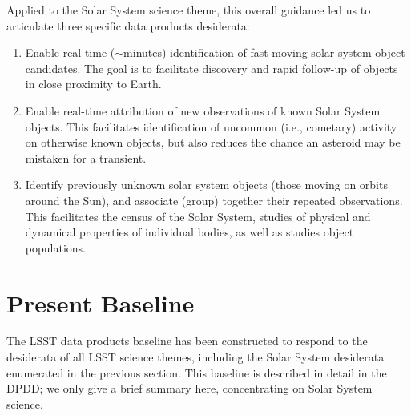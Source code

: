 \documentclass[DM,authoryear,toc,lsstdraft]{lsstdoc}
\begin{document}
Applied to the Solar System science theme, this overall guidance led us to 
articulate three specific data products desiderata:
%
\begin{enumerate}
	\item Enable real-time ($\sim$minutes) identification of fast-moving solar system object candidates. The goal is to facilitate discovery and rapid follow-up of objects in close proximity to Earth.
	\item Enable real-time attribution of new observations of known Solar System objects. This facilitates identification of uncommon (i.e., cometary) activity on otherwise known objects, but also reduces the chance an asteroid may be mistaken for a transient.
	\item Identify previously unknown solar system objects (those moving on orbits around the Sun), and associate (group) together their repeated observations. This facilitates the census of the Solar System, studies of physical and dynamical properties of individual bodies, as well as studies object populations.
\end{enumerate}


\section{Present Baseline}

The LSST data products baseline  has been constructed to respond to the desiderata of all LSST science themes, including the Solar System desiderata enumerated in the previous section. This baseline is described in detail in the DPDD; we only give a brief summary here, concentrating on Solar System science.
\end{document}
